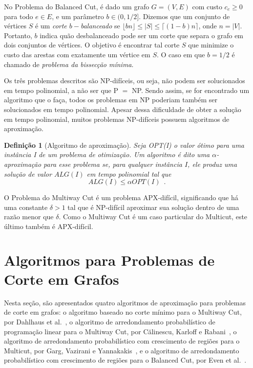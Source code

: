 \documentclass[12pt, a4paper]{article}
\newtheorem{defi}{Definição}[section]
\begin{document}
No Problema do Balanced Cut, é dado um grafo $G=(V, E)$ com custo $c_{e} \ge 0$ para todo $e \in E$, e um parâmetro $b \in (0, 1/2]$.
Dizemos que um conjunto de vértices $S$ é um \emph{corte $b-$balanceado} se $\lfloor bn \rfloor \leq |S| \leq \lceil (1-b)n \rceil$, onde $n = |V|$. Portanto, $b$ indica quão desbalanceado pode ser um corte que separa o grafo em dois conjuntos de vértices.
O objetivo é encontrar tal corte $S$ que minimize o custo das arestas com exatamente um vértice em $S$. O caso em que $b = 1/2$ é chamado de \emph{problema da bissecção mínima}.

Os três problemas descritos são NP-difíceis, ou seja, não podem ser solucionados em tempo polinomial, a não ser que P $=$ NP. Sendo assim, se for encontrado um algoritmo que o faça, todos os problemas em NP poderiam também ser solucionados em tempo polinomial. Apesar dessa dificuldade de obter a solução em tempo polinomial, muitos problemas NP-difíceis possuem algoritmos de aproximação.

\begin{defi}[Algoritmo de aproximação]
\label{def:aproximacao}
Seja OPT(I) o valor ótimo para uma instância I de um problema de otimização. Um algoritmo é dito uma $\alpha$-aproximação para esse problema se, para qualquer instância $I$, ele produz uma solução de valor $ALG(I)$ em tempo polinomial tal que
\[
    ALG(I) \leq \alpha OPT(I) \enspace.
\]
\end{defi}

O Problema do Multiway Cut é um problema APX-difícil, significando que há uma constante $\delta > 1$ tal que é NP-difícil aproximar sua solução dentro de uma razão menor que $\delta$.
Como o Multiway Cut é um caso particular do Multicut, este último também é APX-difícil.

\section{Algoritmos para Problemas de Corte em Grafos}\label{sec:algorithms}

 Nesta seção, são apresentados quatro algoritmos de aproximação para problemas de corte em grafos: o algoritmo baseado no corte mínimo para o Multiway Cut, por Dahlhaus et al.~\cite{DJPSY1994}, o algoritmo de arredondamento probabilístico de programação linear para o Multiway Cut, por Călinescu, Karloff e Rabani~\cite{CKR2000}, o algoritmo de arredondamento probabilístico com crescimento de regiões para o Multicut, por Garg, Vazirani e Yannakakis~\cite{GVY1996}, e o algoritmo de arredondamento probabilístico com crescimento de regiões para o Balanced Cut, por Even et al.~\cite{ENRS1999}.
\end{document}
